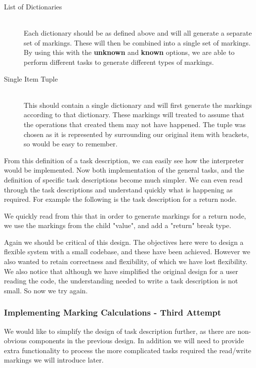 \documentclass[twoside,a4paper]{report}
\begin{document}
\begin{description}
\item[List of Dictionaries] \hfill \\
Each dictionary should be as defined above and will all generate a separate set of markings. These will then be combined into a single set of markings.
By using this with the \textbf{unknown} and \textbf{known} options, we are able to perform different tasks to generate different types of markings.

\item[Single Item Tuple] \hfill \\
This should contain a single dictionary and will first generate the markings according to that dictionary. These markings will treated to assume that
the operations that created them may not have happened. The tuple was chosen as it is represented by surrounding our original item with brackets, so
would be easy to remember.
\end{description}

From this definition of a task description, we can easily see how the interpreter would be implemented. Now both implementation of the general tasks, and
the definition of specific task descriptions become much simpler. We can even read through the task descriptions and understand quickly what is happening
as required. For example the following is the task description for a return node.



We quickly read from this that in order to generate markings for a return node, we use the markings from the child "value", and add a "return" break type.

Again we should be critical of this design. The objectives here were to design a flexible system with a small codebase, and these have been achieved.
However we also wanted to retain correctness and flexibility, of which we have lost flexibility. We also notice that although we have simplified the
original design for a user reading the code, the understanding needed to write a task description is not small. So now we try again.

\subsubsection{Implementing Marking Calculations - Third Attempt}

We would like to simplify the design of task description further, as there are non-obvious components in the previous design. In addition we will
need to provide extra functionality to process the more complicated tasks required the read/write markings we will introduce later.
\end{document}
